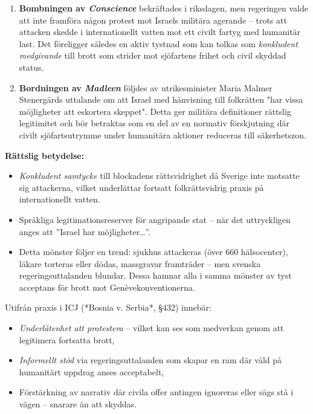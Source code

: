 \begin{enumerate}
  \item \textbf{Bombningen av \textit{Conscience}} bekräftades i riksdagen, men regeringen valde att inte framföra någon protest mot Israels militära agerande – trots att attacken skedde i internationellt vatten mot ett civilt fartyg med humanitär last. Det föreligger således en aktiv tystnad som kan tolkas som \emph{konkludent medgivande} till brott som strider mot sjöfartens frihet och civil skyddad status.
  
  \item \textbf{Bordningen av \textit{Madleen}} följdes av utrikesminister Maria Malmer Stenergärds uttalande om att Israel med hänvisning till folkrätten "har vissa möjligheter att eskortera skeppet". Detta ger militära definitioner rättslig legitimitet och bör betraktas som en del av en normativ förskjutning där civilt sjöfartsutrymme under humanitära aktioner reduceras till säkerhetszon.
\end{enumerate}

\noindent
\textbf{Rättslig betydelse:}
\begin{itemize}
  \item \emph{Konkludent samtycke} till blockadens rättsvidrighet då Sverige inte motsatte sig attackerna, vilket underlättar fortsatt folkrättsvidrig praxis på internationellt vatten.
  \item Språkliga legitimationsreserver för angripande stat – när det uttryckligen anges att ”Israel har möjligheter…”.
  \item Detta mönster följer en trend: sjukhus attackeras (över 660 hälsocenter), läkare torteras eller dödas, massgravar framträder – men svenska regeringsuttalanden blundar. Dessa hamnar alla i samma mönster av tyst acceptans för brott mot Genèvekonventionerna.  
\end{itemize}

\noindent
Utifrån praxis i ICJ (*Bosnia v. Serbia*, §432) innebär:

\begin{itemize}
  \item \emph{Underlåtenhet att protestera} – vilket kan ses som medverkan genom att legitimera fortsatta brott,
  \item \emph{Informellt stöd} via regeringsuttalanden som skapar en ram där våld på humanitärt uppdrag anses acceptabelt,
  \item Förstärkning av narrativ där civila offer antingen ignoreras eller sägs stå i vägen – snarare än att skyddas.
\end{itemize}

